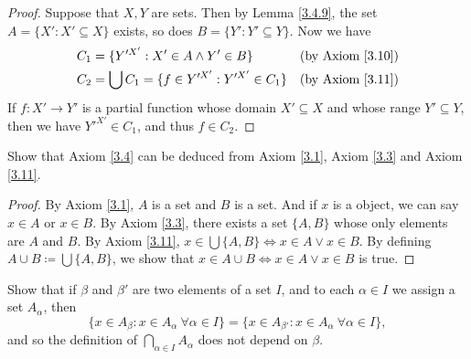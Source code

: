 \begin{proof}
    Suppose that \(X, Y\) are sets.
    Then by Lemma \ref{3.4.9}, the set \(A = \{X' : X' \subseteq X\}\) exists, so does \(B = \{Y' : Y' \subseteq Y\}\).
    Now we have
    \begin{align*}
        C_1 & = \{Y'^{X'} : X' \in A \land Y' \in B\}             & \text{(by Axiom \ref{3.10})} \\
        C_2 & = \bigcup C_1 = \{f \in Y'^{X'} : Y'^{X'} \in C_1\} & \text{(by Axiom \ref{3.11})} \\
    \end{align*}
    If \(f : X' \to Y'\) is a partial function whose domain \(X' \subseteq X\) and whose range \(Y' \subseteq Y\), then we have \(Y'^{X'} \in C_1\), and thus \(f \in C_2\).
\end{proof}

\begin{exercise}\label{ex 3.4.8}
    Show that Axiom \ref{3.4} can be deduced from Axiom \ref{3.1}, Axiom \ref{3.3} and Axiom \ref{3.11}.
\end{exercise}

\begin{proof}
    By Axiom \ref{3.1}, \(A\) is a set and \(B\) is a set.
    And if \(x\) is a object, we can say \(x \in A\) or \(x \in B\).
    By Axiom \ref{3.3}, there exists a set \(\{A, B\}\) whose only elements are \(A\) and \(B\).
    By Axiom \ref{3.11}, \(x \in \bigcup \{A, B\} \iff x \in A \lor x \in B\).
    By defining \(A \cup B \coloneqq \bigcup \{A, B\}\), we show that \(x \in A \cup B \iff x \in A \lor x \in B\) is true.
\end{proof}

\begin{exercise}\label{ex 3.4.9}
    Show that if \(\beta\) and \(\beta'\) are two elements of a set \(I\), and to each \(\alpha \in I\) we assign a set \(A_{\alpha}\), then
    \[
        \{x \in A_{\beta} : x \in A_{\alpha} \ \forall \alpha \in I\} = \{x \in A_{\beta'} : x \in A_{\alpha} \ \forall \alpha \in I\},
    \]
    and so the definition of \(\bigcap_{\alpha \in I} A_{\alpha}\) does not depend on \(\beta\).
\end{exercise}

